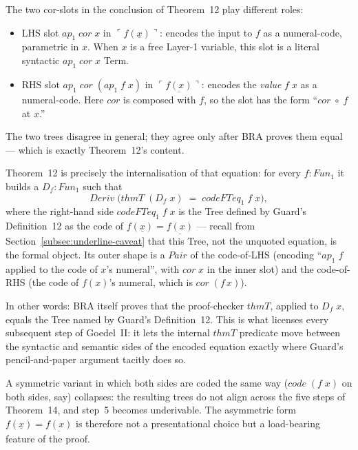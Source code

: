 \documentclass[11pt]{article}
\begin{document}
The two cor-slots in the conclusion of Theorem~12 play different
roles:
\begin{itemize}
  \item LHS slot $\mathit{ap}_1\;\mathit{cor}\;x$ in
        $\ulcorner f(\underline{x}) \urcorner$: encodes the input to
        $f$ as a numeral-code, parametric in $x$.  When $x$ is a
        free Layer-1 variable, this slot is a literal syntactic
        $\mathit{ap}_1\;\mathit{cor}\;x$ Term.
  \item RHS slot $\mathit{ap}_1\;\mathit{cor}\;(\mathit{ap}_1\;f\;x)$ in
        $\ulcorner \underline{f(x)} \urcorner$: encodes the
        \emph{value} $f\;x$ as a numeral-code.  Here $\mathit{cor}$
        is composed with $f$, so the slot has the form
        ``$\mathit{cor}\;\circ\;f$ at $x$.''
\end{itemize}
The two trees disagree in general; they agree only after BRA proves
them equal --- which is exactly Theorem~12's content.

Theorem~12 is precisely the internalisation of that equation: for
every $f : \mathit{Fun}_1$ it builds a $D_f : \mathit{Fun}_1$ such that
\[
  \mathit{Deriv}\;\big(\mathit{thmT}\;(D_f\;x)
       \;=\; \mathit{codeFTeq}_1\;f\;x\big),
\]
where the right-hand side $\mathit{codeFTeq}_1\;f\;x$ is the Tree
defined by Guard's Definition~12 as the code of
$f(\underline{x}) = \underline{f(x)}$ --- recall from
Section~\ref{subsec:underline-caveat} that this Tree, not the
unquoted equation, is the formal object.  Its outer shape is a
$\mathit{Pair}$ of the code-of-LHS (encoding ``$\mathit{ap}_1\;f$
applied to the code of $x$'s numeral'', with $\mathit{cor}\;x$ in
the inner slot) and the code-of-RHS (the code of $f(x)$'s numeral,
which is $\mathit{cor}\;(f\,x)$).

In other words: BRA itself proves that the proof-checker
$\mathit{thmT}$, applied to $D_f\;x$, equals the Tree named by
Guard's Definition~12.  This is what licenses every subsequent step
of Goedel~II: it lets the internal $\mathit{thmT}$ predicate move
between the syntactic and semantic sides of the encoded equation
exactly where Guard's pencil-and-paper argument tacitly does so.

A symmetric variant in which both sides are coded the same way
($\mathit{code}\;(f\;x)$ on both sides, say) collapses: the resulting
trees do not align across the five steps of Theorem~14, and step~5
becomes underivable.  The asymmetric form $f(\underline{x}) =
\underline{f(x)}$ is therefore not a presentational choice but a load-bearing
feature of the proof.
\end{document}
